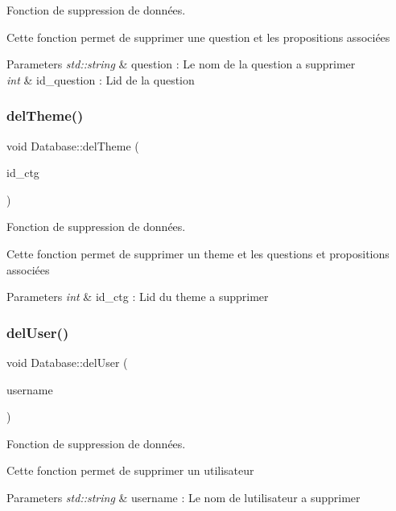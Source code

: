 Fonction de suppression de données. 

Cette fonction permet de supprimer une question et les propositions associées 
\begin{DoxyParams}{Parameters}
{\em std\+::string} & question \+: Le nom de la question a supprimer \\
\hline
{\em int} & id\+\_\+question \+: L\textquotesingle{}id de la question \\
\hline
\end{DoxyParams}
\mbox{\label{classDatabase_a1b99f71f520f57eb4dc53e7ad709660e}} 
\subsubsection{\texorpdfstring{del\+Theme()}{delTheme()}}
{\footnotesize\ttfamily void Database\+::del\+Theme (\begin{DoxyParamCaption}\item[{int}]{id\+\_\+ctg }\end{DoxyParamCaption})}



Fonction de suppression de données. 

Cette fonction permet de supprimer un theme et les questions et propositions associées 
\begin{DoxyParams}{Parameters}
{\em int} & id\+\_\+ctg \+: L\textquotesingle{}id du theme a supprimer \\
\hline
\end{DoxyParams}
\mbox{\label{classDatabase_a6c40c150a977a2c4c4a1c01fe48e7c71}} 
\subsubsection{\texorpdfstring{del\+User()}{delUser()}}
{\footnotesize\ttfamily void Database\+::del\+User (\begin{DoxyParamCaption}\item[{string}]{username }\end{DoxyParamCaption})}



Fonction de suppression de données. 

Cette fonction permet de supprimer un utilisateur 
\begin{DoxyParams}{Parameters}
{\em std\+::string} & username \+: Le nom de l\textquotesingle{}utilisateur a supprimer \\
\hline
\end{DoxyParams}
\mbox{\label{classDatabase_a63fefba403dae2942256ee1704ee282a}} 
